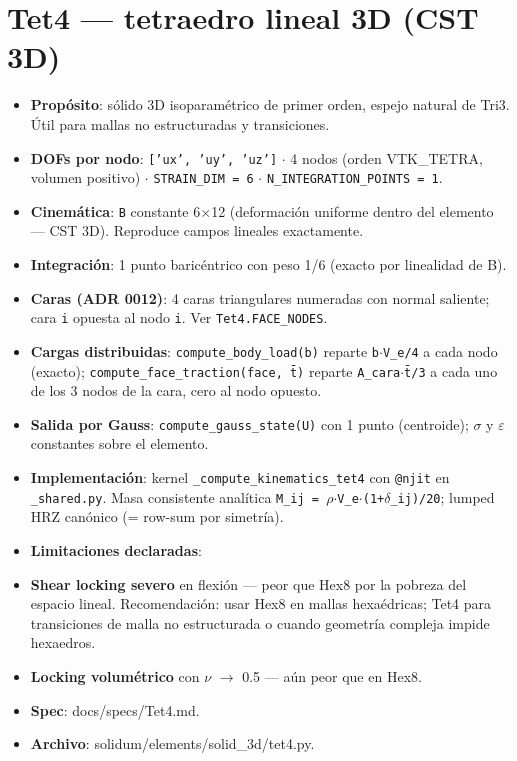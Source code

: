 \documentclass[11pt,letterpaper,oneside]{report}
\begin{document}
\section{Tet4 --- tetraedro lineal 3D (CST 3D)}

\begin{itemize}
  \item \textbf{Propósito}: sólido 3D isoparamétrico de primer orden, espejo natural de Tri3. Útil para mallas no estructuradas y transiciones.
  \item \textbf{DOFs por nodo}: \texttt{['ux', 'uy', 'uz']} \ensuremath{\cdot} 4 nodos (orden VTK\_TETRA, volumen positivo) \ensuremath{\cdot} \texttt{STRAIN\_DIM = 6} \ensuremath{\cdot} \texttt{N\_INTEGRATION\_POINTS = 1}.
  \item \textbf{Cinemática}: \texttt{B} constante 6\ensuremath{\times}12 (deformación uniforme dentro del elemento --- CST 3D). Reproduce campos lineales exactamente.
  \item \textbf{Integración}: 1 punto baricéntrico con peso 1/6 (exacto por linealidad de B).
  \item \textbf{Caras (ADR 0012)}: 4 caras triangulares numeradas con normal saliente; cara \texttt{i} opuesta al nodo \texttt{i}. Ver \texttt{Tet4.FACE\_NODES}.
  \item \textbf{Cargas distribuidas}: \texttt{compute\_body\_load(b)} reparte \texttt{b\ensuremath{\cdot}V\_e/4} a cada nodo (exacto); \texttt{compute\_face\_traction(face, t̄)} reparte \texttt{A\_cara\ensuremath{\cdot}t̄/3} a cada uno de los 3 nodos de la cara, cero al nodo opuesto.
  \item \textbf{Salida por Gauss}: \texttt{compute\_gauss\_state(U)} con 1 punto (centroide); \ensuremath{\sigma} y \ensuremath{\varepsilon} constantes sobre el elemento.
  \item \textbf{Implementación}: kernel \texttt{\_compute\_kinematics\_tet4} con \texttt{@njit} en \texttt{\_shared.py}. Masa consistente analítica \texttt{M\_ij = \ensuremath{\rho}\ensuremath{\cdot}V\_e\ensuremath{\cdot}(1+\ensuremath{\delta}\_ij)/20}; lumped HRZ canónico (= row-sum por simetría).
  \item \textbf{Limitaciones declaradas}:
  \item \textbf{Shear locking severo} en flexión --- peor que Hex8 por la pobreza del espacio lineal. Recomendación: usar Hex8 en mallas hexaédricas; Tet4 para transiciones de malla no estructurada o cuando geometría compleja impide hexaedros.
  \item \textbf{Locking volumétrico} con \ensuremath{\nu} \ensuremath{\to} 0.5 --- aún peor que en Hex8.
  \item \textbf{Spec}: docs/specs/Tet4.md.
  \item \textbf{Archivo}: solidum/elements/solid\_3d/tet4.py.
\end{itemize}
\end{document}
